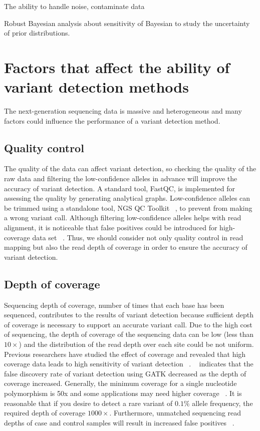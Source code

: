 \documentclass[11pt,reqno]{amsart}
\begin{document}
The ability to handle noise, contaminate data

Robust Bayesian analysis about sensitivity of Bayesian to study the uncertainty of prior distributions.



\section{Factors that affect the ability of variant detection methods}
The next-generation sequencing data is massive and heterogeneous and many factors could influence the performance of a variant detection method.
\subsection{Quality control}
The quality of the data can affect variant detection, so checking the quality of the raw data and filtering the low-confidence alleles in advance will improve the accuracy of variant detection.
A standard tool, FastQC, is implemented for assessing the quality by generating analytical graphs.
Low-confidence alleles can be trimmed using a standalone tool, NGS QC Toolkit ~\citep{patel2012ngs}, to prevent from making a wrong variant call.
Although filtering low-confidence alleles helps with read alignment, it is noticeable that false positives could be introduced for high-coverage data set ~\citep{liu2012steps}.
Thus, we should consider not only quality control in read mapping but also the read depth of coverage in order to ensure the accuracy of variant detection.

\subsection{Depth of coverage}
Sequencing depth of coverage, number of times that each base has been sequenced, contributes to the results of variant detection because sufficient depth of coverage is necessary to support an accurate variant call.
Due to the high cost of sequencing, the depth of coverage of the sequencing data can be low (less than $10\times$) and the distribution of the read depth over each site could be not uniform.
Previous researchers have studied the effect of coverage and revealed that high coverage data leads to high sensitivity of variant detection ~\citep{neuman2013analysis, krawitz2010microindel}.
~\citep{liu2013variant} indicates that the false discovery rate of variant detection using GATK decreased as the depth of coverage increased.
Generally, the minimum coverage for a single nucleotide polymorphism is 50x and some applications may need higher coverage ~\citep{Schlotterer2014}.
It is reasonable that if you desire to detect a rare variant of $0.1 \%$ allele frequency, the required depth of coverage $1000\times$.
Furthermore, unmatched sequencing read depths of case and control samples will result in increased false positives ~\citep{garner2011confounded}.
\end{document}
